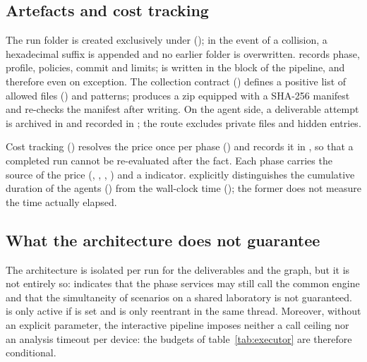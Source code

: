 \subsection{Artefacts and cost tracking}

The run folder is created exclusively under 
(); in the event of a collision, a hexadecimal suffix
is appended and no earlier folder is overwritten.  records
phase, profile, policies, commit and limits;  is written
in the  block of the pipeline, and therefore even on exception. The
collection contract () defines a positive list of
allowed files () and 
patterns;  produces a zip equipped with a
SHA-256 manifest and re-checks the manifest after writing. On the agent side, a
deliverable attempt is archived in  and recorded in
; the route
 excludes private files and hidden
entries.

Cost tracking () resolves the price once per
phase () and records it in , so that a
completed run cannot be re-evaluated after the fact. Each phase carries the source
of the price (, ,
, ) and a 
indicator.  explicitly distinguishes the cumulative duration of
the agents () from the wall-clock time
(); the former does not measure the time actually
elapsed.

\subsection{What the architecture does not guarantee}

The architecture is isolated per run for the deliverables and the graph, but it is
not entirely so:  indicates that the phase
services may still call the common engine and that the simultaneity of scenarios
on a shared laboratory is not guaranteed.  is only active if
 is set and is only reentrant in the same thread. Moreover,
without an explicit parameter, the interactive pipeline imposes neither a call
ceiling nor an analysis timeout per device: the budgets of
table~\ref{tab:executor} are therefore conditional.

